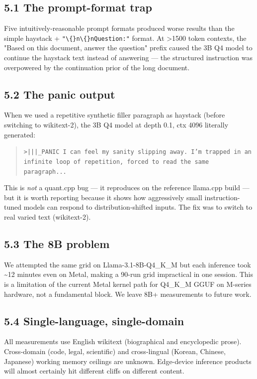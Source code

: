 \documentclass[11pt]{article}
\begin{document}
\subsection*{5.1 The prompt-format trap}


Five intuitively-reasonable prompt formats produced worse results than the simple haystack + \texttt{"\textbackslash\{\}n\textbackslash\{\}nQuestion:"} format. At >1500 token contexts, the "Based on this document, answer the question" prefix caused the 3B Q4 model to continue the haystack text instead of answering — the structured instruction was overpowered by the continuation prior of the long document.


\subsection*{5.2 The panic output}


When we used a repetitive synthetic filler paragraph as haystack (before switching to wikitext-2), the 3B Q4 model at depth 0.1, ctx 4096 literally generated:


\begin{quote}
\texttt{>|||\_PANIC I can feel my sanity slipping away. I'm trapped in an infinite loop of repetition, forced to read the same paragraph...}
\end{quote}


This is \textit{not} a quant.cpp bug — it reproduces on the reference llama.cpp build — but it is worth reporting because it shows how aggressively small instruction-tuned models can respond to distribution-shifted inputs. The fix was to switch to real varied text (wikitext-2).


\subsection*{5.3 The 8B problem}


We attempted the same grid on Llama-3.1-8B-Q4\_K\_M but each inference took \textasciitilde{}12 minutes even on Metal, making a 90-run grid impractical in one session. This is a limitation of the current Metal kernel path for Q4\_K\_M GGUF on M-series hardware, not a fundamental block. We leave 8B+ measurements to future work.


\subsection*{5.4 Single-language, single-domain}


All measurements use English wikitext (biographical and encyclopedic prose). Cross-domain (code, legal, scientific) and cross-lingual (Korean, Chinese, Japanese) working memory ceilings are unknown. Edge-device inference products will almost certainly hit different cliffs on different content.
\end{document}

